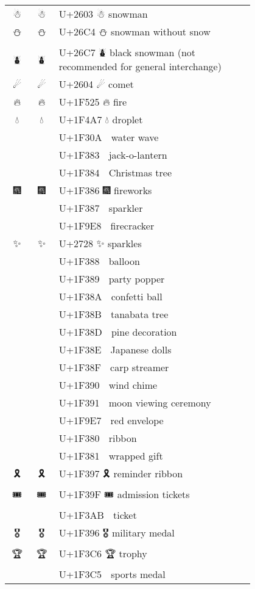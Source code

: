 \documentclass[a4paper,12pt]{ltjarticle}
\newcommand{\fontA}[1]{{\fontspec[RawFeature={mode=harf,+dist,+ccmp}]{Segoe UI Emoji} #1}}
\newcommand{\fontB}[1]{{\fontspec[RawFeature={mode=harf,+dist,+ccmp}]{Noto Color Emoji} #1}}
\begin{document}
\begin{longtable}[c]{ccp{0.8\linewidth}}
\fontA{☃}&\fontB{☃}&U+2603 ☃ snowman\\
\fontA{⛄}&\fontB{⛄}&U+26C4 ⛄ snowman without snow\\
\fontA{⛇}&\fontB{⛇}&U+26C7 ⛇ black snowman (not recommended for general interchange)\\
\fontA{☄}&\fontB{☄}&U+2604 ☄ comet\\
\fontA{🔥}&\fontB{🔥}&U+1F525 🔥 fire\\
\fontA{💧}&\fontB{💧}&U+1F4A7 💧 droplet\\
\fontA{🌊}&\fontB{🌊}&U+1F30A 🌊 water wave\\
\fontA{🎃}&\fontB{🎃}&U+1F383 🎃 jack-o-lantern\\
\fontA{🎄}&\fontB{🎄}&U+1F384 🎄 Christmas tree\\
\fontA{🎆}&\fontB{🎆}&U+1F386 🎆 fireworks\\
\fontA{🎇}&\fontB{🎇}&U+1F387 🎇 sparkler\\
\fontA{🧨}&\fontB{🧨}&U+1F9E8 🧨 firecracker\\
\fontA{✨}&\fontB{✨}&U+2728 ✨ sparkles\\
\fontA{🎈}&\fontB{🎈}&U+1F388 🎈 balloon\\
\fontA{🎉}&\fontB{🎉}&U+1F389 🎉 party popper\\
\fontA{🎊}&\fontB{🎊}&U+1F38A 🎊 confetti ball\\
\fontA{🎋}&\fontB{🎋}&U+1F38B 🎋 tanabata tree\\
\fontA{🎍}&\fontB{🎍}&U+1F38D 🎍 pine decoration\\
\fontA{🎎}&\fontB{🎎}&U+1F38E 🎎 Japanese dolls\\
\fontA{🎏}&\fontB{🎏}&U+1F38F 🎏 carp streamer\\
\fontA{🎐}&\fontB{🎐}&U+1F390 🎐 wind chime\\
\fontA{🎑}&\fontB{🎑}&U+1F391 🎑 moon viewing ceremony\\
\fontA{🧧}&\fontB{🧧}&U+1F9E7 🧧 red envelope\\
\fontA{🎀}&\fontB{🎀}&U+1F380 🎀 ribbon\\
\fontA{🎁}&\fontB{🎁}&U+1F381 🎁 wrapped gift\\
\fontA{🎗}&\fontB{🎗}&U+1F397 🎗 reminder ribbon\\
\fontA{🎟}&\fontB{🎟}&U+1F39F 🎟 admission tickets\\
\fontA{🎫}&\fontB{🎫}&U+1F3AB 🎫 ticket\\
\fontA{🎖}&\fontB{🎖}&U+1F396 🎖 military medal\\
\fontA{🏆}&\fontB{🏆}&U+1F3C6 🏆 trophy\\
\fontA{🏅}&\fontB{🏅}&U+1F3C5 🏅 sports medal\\

\end{longtable}
\end{document}
